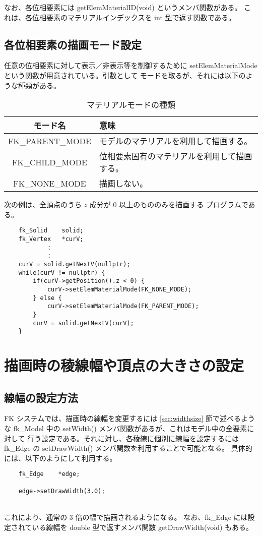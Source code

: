 なお、各位相要素には getElemMaterialID(void) というメンバ関数がある。
これは、各位相要素のマテリアルインデックスを int 型で返す関数である。

\subsection{各位相要素の描画モード設定}	\label{subsec:matmode}
任意の位相要素に対して表示／非表示等を制御するために
setElemMaterialMode という関数が用意されている。引数として
モードを取るが、それには以下のような種類がある。

\begin{table}[H]
\caption{マテリアルモードの種類}
\label{tbl:mate1}
\begin{center}
\begin{tabular}{|c|l|}
\hline
モード名 & 意味 \\ \hline \hline
FK\_PARENT\_MODE & モデルのマテリアルを利用して描画する。\\ \hline
FK\_CHILD\_MODE & 位相要素固有のマテリアルを利用して描画する。\\ \hline
FK\_NONE\_MODE & 描画しない。\\ \hline
\end{tabular}
\end{center}
\end{table}
次の例は、全頂点のうち \(z\) 成分が 0 以上のもののみを描画する
プログラムである。
\\
\begin{breakbox}
\begin{verbatim}
    fk_Solid    solid;
    fk_Vertex   *curV;
            :
            :
    curV = solid.getNextV(nullptr);
    while(curV != nullptr) {
        if(curV->getPosition().z < 0) {
            curV->setElemMaterialMode(FK_NONE_MODE);
        } else {
            curV->setElemMaterialMode(FK_PARENT_MODE);
        }
        curV = solid.getNextV(curV);
    }
\end{verbatim}
\end{breakbox}
\section{描画時の稜線幅や頂点の大きさの設定}
\subsection{線幅の設定方法}
FK システムでは、描画時の線幅を変更するには
\ref{sec:widthsize} 節で述べるような fk\_Model 中の
setWidth() メンバ関数があるが、これはモデル中の全要素に対して
行う設定である。それに対し、各稜線に個別に線幅を設定するには
fk\_Edge の setDrawWidth() メンバ関数を利用することで可能となる。
具体的には、以下のようにして利用する。
\\
\begin{screen}
\begin{verbatim}
    fk_Edge    *edge;

    edge->setDrawWidth(3.0);
\end{verbatim}
\end{screen}
~ \\
これにより、通常の 3 倍の幅で描画されるようになる。
なお、fk\_Edge には設定されている線幅を double 型で返すメンバ関数
getDrawWidth(void) もある。
